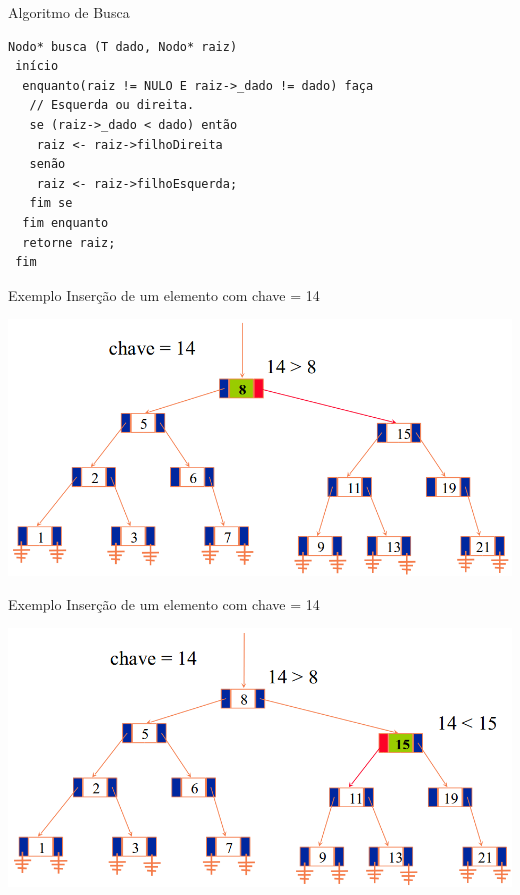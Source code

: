 \documentclass[12pt,table,xcolor={dvipsnames}]{beamer}
\begin{document}
\begin{frame}[fragile]{Algoritmo de Busca}
          \begin{lstlisting}
Nodo* busca (T dado, Nodo* raiz)
 início
  enquanto(raiz != NULO E raiz->_dado != dado) faça
   // Esquerda ou direita.
   se (raiz->_dado < dado) então
    raiz <- raiz->filhoDireita
   senão
    raiz <- raiz->filhoEsquerda;
   fim se
  fim enquanto
  retorne raiz;
 fim
 \end{lstlisting}
\end{frame} 

\begin{frame}[fragile]{Exemplo}
Inserção de um elemento com chave = 14
\begin{center}
\includegraphics[scale=.3]{arv2.png} 
\end{center}
\end{frame}

\begin{frame}[fragile]{Exemplo}
Inserção de um elemento com chave = 14
\begin{center}
\includegraphics[scale=.3]{arv3.png} 
\end{center}
\end{frame}
\end{document}

